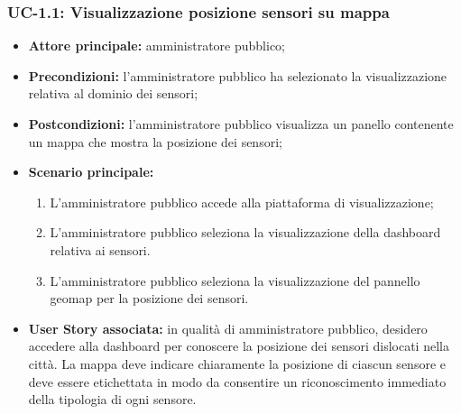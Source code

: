 \documentclass[8pt]{article}
\begin{document}
\subsubsection*{UC-1.1: Visualizzazione posizione sensori su mappa}
\begin{itemize}
    \item \textbf{Attore principale:} amministratore pubblico;
    \item \textbf{Precondizioni:} l’amministratore pubblico ha selezionato la visualizzazione
        relativa al dominio dei sensori;
    \item \textbf{Postcondizioni:} l'amministratore pubblico visualizza un panello contenente un
        mappa che mostra la posizione dei sensori;
    \item \textbf{Scenario principale:}
    \begin{enumerate}
      \item L’amministratore pubblico accede alla piattaforma di visualizzazione;
      \item L’amministratore pubblico seleziona la visualizzazione della dashboard relativa ai sensori.
      \item L’amministratore pubblico seleziona la visualizzazione del pannello geomap per la
          posizione dei sensori.
    \end{enumerate}
    \item \textbf{User Story associata:} in qualità di amministratore pubblico, desidero accedere
        alla dashboard per conoscere la posizione dei sensori dislocati nella città. La mappa deve indicare chiaramente la posizione di ciascun sensore e deve essere etichettata in modo da consentire un riconoscimento immediato della tipologia di ogni sensore.
\end{itemize}
\end{document}
